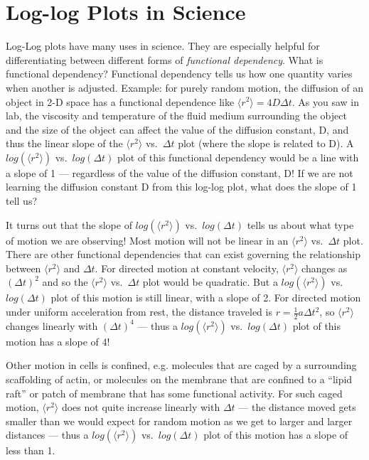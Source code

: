 \section{Log-log Plots in Science}
Log-Log plots have many uses in science.
They are especially helpful for differentiating between different forms of \emph{functional dependency}.
What is functional dependency? 
Functional dependency tells us how one quantity varies when another is adjusted. 
Example: for purely random motion, the diffusion of an object in 2-D space has a functional dependence like $\langle r^{2} \rangle = 4 D \Delta t$. 
As you saw in lab, the viscosity and temperature of the fluid medium surrounding the object and the size of the object can affect the value of the diffusion constant, D, and thus the linear slope of the $\langle r^{2} \rangle$ vs.\ $\Delta t$ plot (where the slope is related to D). 
A $log(\langle r^{2} \rangle)$ vs.\ $log(\Delta t)$ plot of this functional dependency would be a line with a slope of 1 — regardless of the value of the diffusion constant, D! 
If we are not learning the diffusion constant D from this log-log plot, what does the slope of 1 tell us?
\par 
It turns out that the slope of $log(\langle r^{2} \rangle)$ vs.\ $log(\Delta t)$ tells us about what type of motion we are observing! 
Most motion will not be linear in an $\langle r^{2} \rangle$ vs.\ $\Delta t$ plot. 
There are other functional dependencies that can exist governing the relationship between $\langle r^{2} \rangle$ and $\Delta t$. 
For directed motion at constant velocity, $\langle r^{2} \rangle$ changes as $(\Delta t)^{2}$ and so the $\langle r^{2} \rangle$ vs.\ $\Delta t$ plot would be quadratic. 
But a $log(\langle r^{2} \rangle)$ vs.\ $log(\Delta t)$ plot of this motion is still linear, with a slope of 2. 
For directed motion under uniform acceleration from rest, the distance traveled is $r = \frac{1}{2} a \Delta t^{2}$, so $\langle r^{2} \rangle$ changes linearly with $(\Delta t)^{4}$ — thus a $log(\langle r^{2} \rangle)$ vs.\ $log(\Delta t)$ plot of this motion has a slope of 4!
\par 
Other motion in cells is confined, e.g. molecules that are caged by a surrounding scaffolding of actin, or molecules on the membrane that are confined to a ``lipid raft'' or patch of membrane that has some functional activity. 
For such caged motion, $\langle r^{2} \rangle$ does not quite increase linearly with $\Delta t$ — the distance moved gets smaller than we would expect for random motion as we get to larger and larger distances — thus a $log(\langle r^{2} \rangle)$ vs.\ $log(\Delta t)$ plot of this motion has a slope of less than 1.
